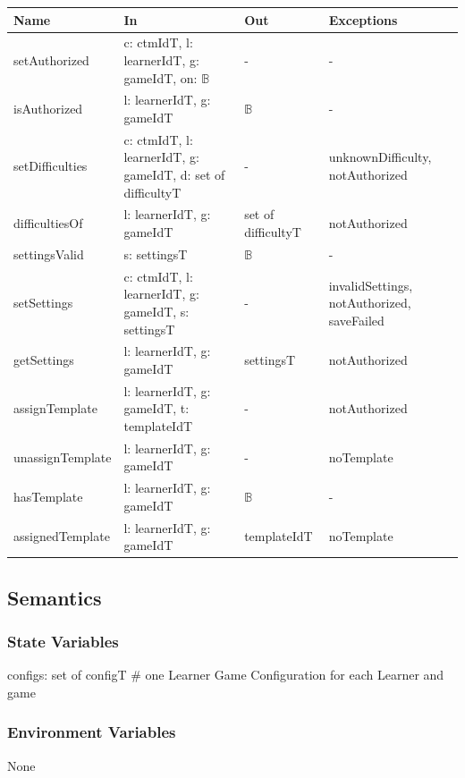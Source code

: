 \documentclass[12pt, titlepage]{article}
\begin{document}
\begin{center}
\small
\begin{tabular}{p{3.3cm} p{4.7cm} p{2.6cm} p{2.8cm}}
\hline
\textbf{Name} & \textbf{In} & \textbf{Out} & \textbf{Exceptions} \\
\hline
setAuthorized & c: ctmIdT, l: learnerIdT, g: gameIdT, on: $\mathbb{B}$ & - & - \\
isAuthorized & l: learnerIdT, g: gameIdT & $\mathbb{B}$ & - \\
setDifficulties & c: ctmIdT, l: learnerIdT, g: gameIdT, d: set of difficultyT & - & unknownDifficulty, notAuthorized \\
difficultiesOf & l: learnerIdT, g: gameIdT & set of difficultyT & notAuthorized \\
settingsValid & s: settingsT & $\mathbb{B}$ & - \\
setSettings & c: ctmIdT, l: learnerIdT, g: gameIdT, s: settingsT & - & invalidSettings, notAuthorized, saveFailed \\
getSettings & l: learnerIdT, g: gameIdT & settingsT & notAuthorized \\
assignTemplate & l: learnerIdT, g: gameIdT, t: templateIdT & - & notAuthorized \\
unassignTemplate & l: learnerIdT, g: gameIdT & - & noTemplate \\
hasTemplate & l: learnerIdT, g: gameIdT & $\mathbb{B}$ & - \\
assignedTemplate & l: learnerIdT, g: gameIdT & templateIdT & noTemplate \\
\hline
\end{tabular}
\end{center}

\subsection{Semantics}

\subsubsection{State Variables}

configs: set of configT \# one Learner Game Configuration for each Learner and
game

\subsubsection{Environment Variables}

None
\end{document}
